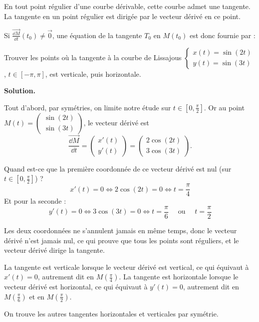 \documentclass[class=report,crop=false]{standalone}
\begin{document}
\begin{theoreme}
En tout point régulier d'une courbe dérivable, cette courbe admet une tangente.
La tangente en un point régulier est dirigée par le vecteur dérivé en ce point.
\end{theoreme}



Si $\overrightarrow{\frac{\dd M}{\dd t}}(t_0)\neq\vec{0}$,
une équation de la tangente $T_0$ en $M(t_0)$ est donc fournie par :

\begin{exemple}
Trouver les points où la tangente à la courbe de Lissajous
$\left\{
\begin{array}{l}
x(t)=\sin(2t)\\
y(t)=\sin(3t)
\end{array}
\right.$, $t\in [-\pi,\pi]$,
est verticale, puis horizontale.


\medskip
\textbf{Solution.}

Tout d'abord, par symétries, on limite notre étude sur $t\in[0,\frac\pi2]$.
Or au point $M(t) = \left(\begin{smallmatrix} \sin(2t) \\ \sin(3t)\end{smallmatrix}\right)$,
le vecteur dérivé est
$$\overrightarrow{\frac{\dd M}{\dd t}}
= \left(\begin{matrix} x'(t) \\ y'(t) \end{matrix}\right)
= \left(\begin{matrix} 2\cos(2t) \\ 3\cos(3t)\end{matrix}\right).$$

Quand est-ce que la première coordonnée de ce vecteur dérivé est nul
(sur $t\in[0,\frac\pi2]$) ?
$$x'(t) = 0 \iff 2\cos(2t) = 0 \iff t = \frac\pi4$$
Et pour la seconde :
$$y'(t) = 0 \iff 3\cos(3t) = 0 \iff t = \frac\pi6  \quad\text{ ou }\quad t=\frac\pi2$$

Les deux coordonnées ne s'annulent jamais en même temps, donc
le vecteur dérivé n'est jamais nul, ce qui prouve que tous les points sont réguliers,
et le vecteur dérivé dirige la tangente.

La tangente est verticale lorsque le vecteur dérivé est vertical,
ce qui équivaut à $x'(t) = 0$, autrement dit en $M(\frac\pi4)$.
La tangente est horizontale lorsque le vecteur dérivé est horizontal,
ce qui équivaut à $y'(t) = 0$, autrement dit en $M(\frac\pi6)$
et en $M(\frac\pi2)$.


On trouve les autres tangentes horizontales et verticales par symétrie.
\end{exemple}
\end{document}
